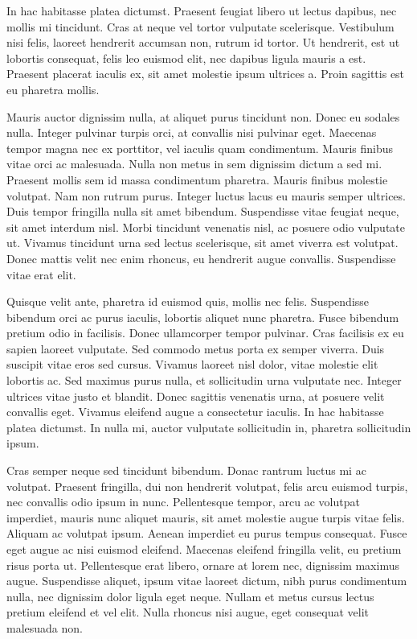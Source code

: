 \documentclass{article}
\begin{document}
In hac habitasse platea dictumst. Praesent feugiat libero ut lectus dapibus, nec mollis mi tincidunt. Cras at neque vel tortor vulputate scelerisque. Vestibulum nisi felis, laoreet hendrerit accumsan non, rutrum id tortor. Ut hendrerit, est ut lobortis consequat, felis leo euismod elit, nec dapibus ligula mauris a est. Praesent placerat iaculis ex, sit amet molestie ipsum ultrices a. Proin sagittis est eu pharetra mollis.

Mauris auctor dignissim nulla, at aliquet purus tincidunt non. Donec eu sodales nulla. Integer pulvinar turpis orci, at convallis nisi pulvinar eget. Maecenas tempor magna nec ex porttitor, vel iaculis quam condimentum. Mauris finibus vitae orci ac malesuada. Nulla non metus in sem dignissim dictum a sed mi. Praesent mollis sem id massa condimentum pharetra. Mauris finibus molestie volutpat. Nam non rutrum purus. Integer luctus lacus eu mauris semper ultrices. Duis tempor fringilla nulla sit amet bibendum. Suspendisse vitae feugiat neque, sit amet interdum nisl. Morbi tincidunt venenatis nisl, ac posuere odio vulputate ut. Vivamus tincidunt urna sed lectus scelerisque, sit amet viverra est volutpat. Donec mattis velit nec enim rhoncus, eu hendrerit augue convallis. Suspendisse vitae erat elit.

Quisque velit ante, pharetra id euismod quis, mollis nec felis. Suspendisse bibendum orci ac purus iaculis, lobortis aliquet nunc pharetra. Fusce bibendum pretium odio in facilisis. Donec ullamcorper tempor pulvinar. Cras facilisis ex eu sapien laoreet vulputate. Sed commodo metus porta ex semper viverra. Duis suscipit vitae eros sed cursus. Vivamus laoreet nisl dolor, vitae molestie elit lobortis ac. Sed maximus purus nulla, et sollicitudin urna vulputate nec. Integer ultrices vitae justo et blandit. Donec sagittis venenatis urna, at posuere velit convallis eget. Vivamus eleifend augue a consectetur iaculis. In hac habitasse platea dictumst. In nulla mi, auctor vulputate sollicitudin in, pharetra sollicitudin ipsum.

Cras semper neque sed tincidunt bibendum. Donac rantrum luctus mi ac volutpat.
Praesent fringilla, dui non hendrerit volutpat, felis arcu euismod turpis, nec convallis odio ipsum in nunc. Pellentesque tempor, arcu ac volutpat imperdiet, mauris nunc aliquet mauris, sit amet molestie augue turpis vitae felis. Aliquam ac volutpat ipsum. Aenean imperdiet eu purus tempus consequat. Fusce eget augue ac nisi euismod eleifend. Maecenas eleifend fringilla velit, eu pretium risus porta ut. Pellentesque erat libero, ornare at lorem nec, dignissim maximus augue. Suspendisse aliquet, ipsum vitae laoreet dictum, nibh purus condimentum nulla, nec dignissim dolor ligula eget neque. Nullam et metus cursus lectus pretium eleifend et vel elit. Nulla rhoncus nisi augue, eget consequat velit malesuada non.
\end{document}
